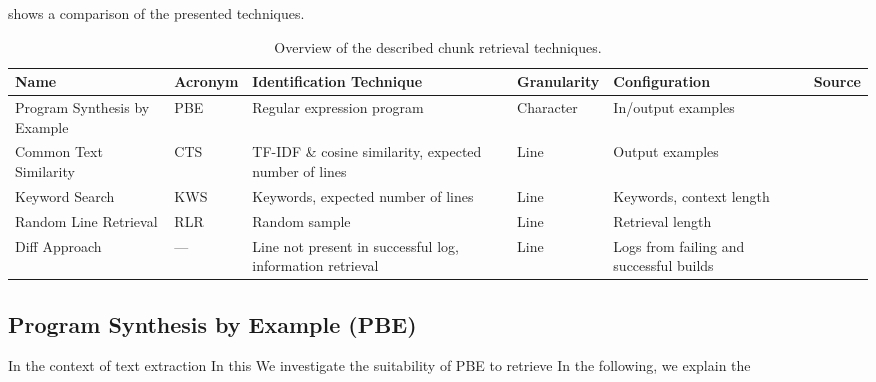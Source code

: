  shows a comparison of the presented techniques.

\begin{table}[]
\centering
\caption{Overview of the described chunk retrieval techniques.}
\begin{tabularx}{\textwidth}{@{}XlXlXX@{}}
\toprule
Name                         & Acronym & Identification Technique
& Granularity & Configuration & Source            \\
\midrule
Program Synthesis by Example & PBE     & Regular expression program
& Character   & In/output examples      \\
Common Text Similarity       & CTS     & TF-IDF \& cosine similarity,
expected number of lines & Line        & Output examples           \\
Keyword Search               & KWS     & Keywords, expected number of
lines                    & Line        & Keywords, context length  \\
Random Line Retrieval        & RLR     & Random sample
& Line        & Retrieval length          \\
Diff Approach                & ---     & Line not present in successful
log, information retrieval  & Line        & Logs from failing and
successful builds      \\
\bottomrule
\end{tabularx}
\label{tab:ctr}
\end{table}

\subsection{Program Synthesis by Example (PBE)}
\label{sec:expl-pbe}
In the context of text extraction
In this
We investigate the suitability of PBE to retrieve
In the following, we explain the

